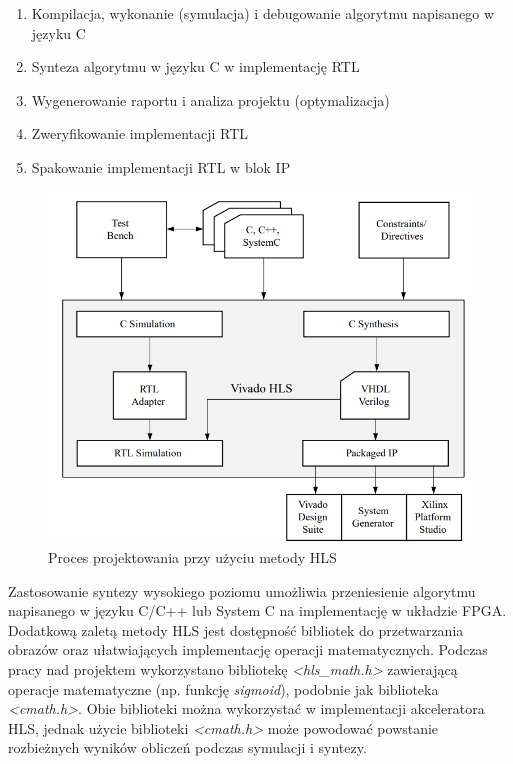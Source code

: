 \begin{enumerate}
    \item Kompilacja, wykonanie (symulacja) i debugowanie algorytmu napisanego w języku C
    \item Synteza algorytmu w języku C w implementację RTL
    \item Wygenerowanie raportu i analiza projektu (optymalizacja)
    \item Zweryfikowanie implementacji RTL
    \item Spakowanie implementacji RTL w blok IP
\end{enumerate}


\begin{figure}[!h]
  \centering
  \includegraphics[width=\textwidth]{img/hls_design_flow.png}
  \caption{Proces projektowania przy użyciu metody HLS}
  \label{hls_design_flow}
\end{figure}

Zastosowanie syntezy wysokiego poziomu umożliwia przeniesienie algorytmu napisanego w języku C/C++ lub System C na implementację w układzie FPGA. Dodatkową zaletą metody HLS jest dostępność bibliotek do przetwarzania 
obrazów oraz ułatwiających implementację operacji matematycznych. Podczas pracy nad projektem wykorzystano bibliotekę \emph
{<hls\_math.h>} zawierającą operacje matematyczne (np. funkcję \emph{sigmoid}), podobnie jak biblioteka \emph{<cmath.h>}. 
Obie biblioteki można wykorzystać w implementacji akceleratora HLS, jednak użycie biblioteki \emph{<cmath.h>} może powodować 
powstanie rozbieżnych wyników obliczeń podczas symulacji i syntezy.

